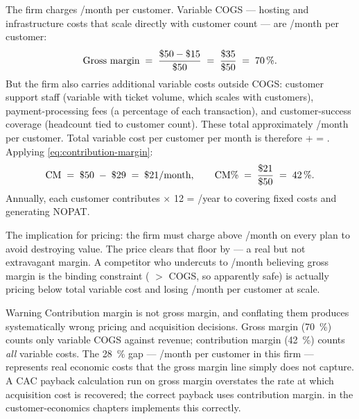 \begin{example}
The firm charges /month per customer. Variable COGS --- hosting and infrastructure
costs that scale directly with customer count --- are /month per customer:
\[
  \text{Gross margin} \;=\; \frac{\$\num{50} - \$\num{15}}{\$\num{50}} \;=\; \frac{\$\num{35}}{\$\num{50}} \;=\; \qty{70}{\percent}.
\]
But the firm also carries additional variable costs outside COGS: customer support staff
(variable with ticket volume, which scales with customers), payment-processing fees (a
percentage of each transaction), and customer-success coverage (headcount tied to customer
count). These total approximately /month per customer. Total variable cost per
customer per month is therefore  +  = . Applying
\cref{eq:contribution-margin}:
\[
  \mathrm{CM} \;=\; \$\num{50} \;-\; \$\num{29} \;=\; \$\num{21}/\text{month},
  \qquad
  \mathrm{CM\%} \;=\; \frac{\$\num{21}}{\$\num{50}} \;=\; \qty{42}{\percent}.
\]
Annually, each customer contributes  \(\times\) 12 = /year to covering
fixed costs and generating NOPAT.

The implication for pricing: the firm must charge above /month on every plan to
avoid destroying value. The  price clears that floor by  --- a real but
not extravagant margin. A competitor who undercuts to /month believing gross margin
is the binding constraint ( \(>\)  COGS, so apparently safe) is actually
pricing below total variable cost and losing /month per customer at scale.
\end{example}

\begin{admonition}{Warning}
Contribution margin is not gross margin, and conflating them produces systematically wrong
pricing and acquisition decisions. Gross margin (\qty{70}{\percent}) counts only variable
COGS against revenue; contribution margin (\qty{42}{\percent}) counts \emph{all} variable
costs. The \qty{28}{\percent} gap --- /month per customer in this firm --- represents
real economic costs that the gross margin line simply does not capture. A CAC payback
calculation run on gross margin overstates the rate at which acquisition cost is recovered;
the correct payback uses contribution margin.  in the customer-economics
chapters implements this correctly.
\end{admonition}

